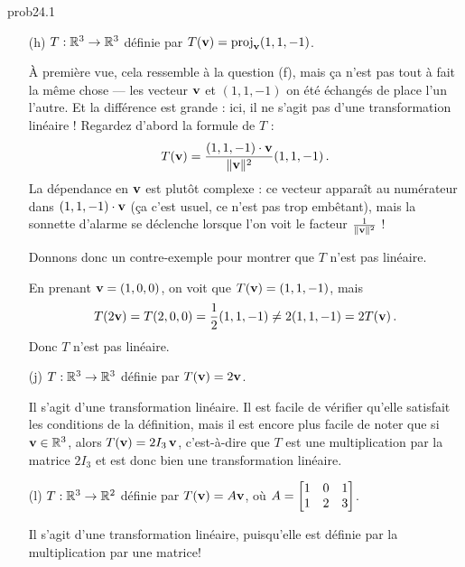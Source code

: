 \begin{sol}{prob24.1}
\begin{enumerate}[]
\item[(h)] $T:\mathbb{R}^3 \to \mathbb{R}^3$ d\'efinie par $T(\mathbf{v})= \operatorname{proj}_{\mathbf{v}}(1,1,-1)$.

\soln À première vue, cela ressemble à la question (f), mais ça n'est pas tout à fait la même chose --- les vecteur $\mathbf{v}$ et $(1,1,-1)$ on été échangés de place l'un l'autre. Et la différence est grande : ici, il ne s'agit pas d'une transformation linéaire ! Regardez d'abord la formule de $T$ : 
$$T(\mathbf{v}) =\frac{(1,1,-1)\cdot \mathbf{v} }{\|\mathbf{v}\|^2} (1,1,-1)\,.$$ 
La dépendance en $\mathbf{v}$ est plutôt complexe : ce vecteur apparaît au numérateur dans $(1,1,-1)\cdot \mathbf{v}$ (ça c'est usuel, ce n'est pas trop embêtant), mais la sonnette d'alarme se déclenche lorsque l'on voit le facteur $\frac{1}{\|\mathbf{v}\|^2}$ ! 

Donnons donc un contre-exemple pour montrer que $T$ n'est pas linéaire.

En prenant $\mathbf{v}=(1,0,0)$, on voit que $T(\mathbf{v})=(1,1,-1)$, mais 
$$T(2\mathbf{v})=T(2,0,0)=\frac12 (1,1,-1)\not= 2 (1,1,-1)=2 T(\mathbf{v})\,.$$ 
Donc $T$ n'est pas linéaire.
\medskip



\item[(j)] $T:\mathbb{R}^3 \to \mathbb{R}^3$ d\'efinie par $T(\mathbf{v})= 2 \mathbf{v}$.

\soln Il s'agit d'une transformation linéaire. Il est facile de vérifier qu'elle satisfait les conditions de la définition, mais il est encore plus facile de noter que si $\mathbf{v}\in \mathbb{R}^3$, alors $T(\mathbf{v})=2I_3\, \mathbf{v}$, c'est-à-dire que $T$ est une multiplication par la matrice $2I_3$ et est donc bien une transformation linéaire. 
\medskip



\item[(l)] $T:\mathbb{R}^3 \to \mathbb{R}^2$ d\'efinie par $T(\mathbf{v})= A\mathbf{v}$, où $A=\bmatrix 1&0&1\\ 1&2&3\endbmatrix$.

\soln Il s'agit d'une transformation linéaire, puisqu'elle est définie par la multiplication par une matrice!
\medskip

\end{enumerate} 

\end{sol}


